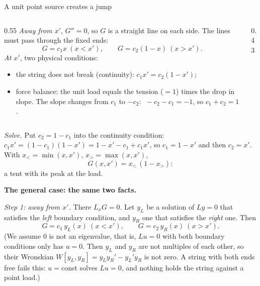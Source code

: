 \documentclass[11pt]{beamer}
\begin{document}
\begin{frame}[allowframebreaks=1.00]{A unit point source creates a jump}
\begin{columns}[T]
\begin{column}{0.55\textwidth}
\emph{Away from \(x'\)}, \(G''=0\), so \(G\) is a straight line on each side. The lines must pass through the
fixed ends:
\[
 G=c_1x\ (x<x'),\qquad G=c_2(1-x)\ (x>x').
\]
\emph{At \(x'\)}, two physical conditions:
\begin{itemize}
 \item the string does not break (continuity): \(c_1x'=c_2(1-x')\);
 \item force balance: the unit load equals the tension (\(=1\)) times the drop in slope. The slope
       changes from \(c_1\) to \(-c_2\): \(\;-c_2-c_1=-1\), so \(c_1+c_2=1\).
\end{itemize}
\end{column}
\begin{column}{0.43\textwidth}
\centering
{}
\end{column}
\end{columns}
\par\framebreak\par
\emph{Solve.} Put \(c_2=1-c_1\) into the continuity condition:
\(c_1x'=(1-c_1)(1-x')=1-x'-c_1+c_1x'\), so \(c_1=1-x'\) and then \(c_2=x'\). With \(x_<=\min(x,x')\),
\(x_>=\max(x,x')\),
\[
 G(x,x')=x_<\,(1-x_>):
\]
a tent with its peak at the load.


\textbf{The general case: the same two facts.}

\emph{Step 1: away from \(x'\).} There \(L_xG=0\). Let \(y_L\) be a solution of \(Ly=0\) that satisfies the
\emph{left} boundary condition, and \(y_R\) one that satisfies the \emph{right} one. Then
\[
 G=c_1\,y_L(x)\ (x<x'),\qquad G=c_2\,y_R(x)\ (x>x').
\]
(We assume \(0\) is not an eigenvalue, that is, \(Lu=0\) with both boundary conditions only has
\(u=0\). Then \(y_L\) and \(y_R\) are not multiples of each other, so their Wronskian
\(W[y_L,y_R]=y_Ly_R'-y_L'y_R\) is not zero. A string with both ends free fails this: \(u=\)const solves
\(Lu=0\), and nothing holds the string against a point load.)


\end{frame}
\end{document}
